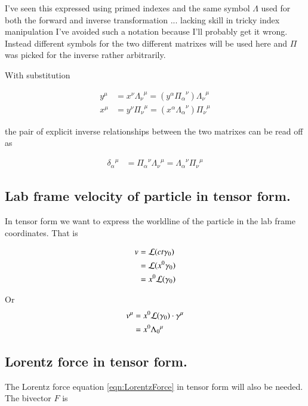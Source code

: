 \documentclass{article}
\newcommand{\ILambda}[0]{\Pi}
\begin{document}
I've seen this expressed using primed indexes and the same symbol $\Lambda$ used for both the forward and inverse
transformation ... lacking skill in tricky index manipulation I've avoided such a notation because I'll probably get it
wrong.  Instead different symbols for the two different matrixes will be used here and $\Pi$ was picked for the inverse
rather arbitrarily.

With substitution

\begin{align*}
y^\mu &= x^\nu {\Lambda_\nu}^\mu = (y^\alpha {\ILambda_\alpha}^\nu) {\Lambda_\nu}^\mu  \\
x^\mu &= y^\nu {\ILambda_\nu}^\mu = (x^\alpha {\Lambda_\alpha}^\nu) {\ILambda_\nu}^\mu 
\end{align*}

the pair of explicit inverse relationships between the two matrixes can be read off as

\begin{align}
{\delta_\alpha}^\mu &= {\ILambda_\alpha}^\nu {\Lambda_\nu}^\mu = {\Lambda_\alpha}^\nu {\ILambda_\nu}^\mu 
\end{align}

\subsection{ Lab frame velocity of particle in tensor form. }

In tensor form we want to express the worldline of the particle in the lab frame coordinates.  That is

\begin{align*}
v 
&= \mathcal{L}(c t \gamma_0) \\
&= \mathcal{L}(x^0 \gamma_0) \\
&= x^0 \mathcal{L}(\gamma_0) \\
\end{align*}

Or
\begin{align*}
v^\mu 
&= x^0 \mathcal{L}(\gamma_0) \cdot \gamma^\mu \\
&= x^0 {\Lambda_0}^\mu
\end{align*}

\subsection{ Lorentz force in tensor form. }

The Lorentz force equation \ref{eqn:LorentzForce} in tensor form will also be needed.  The bivector $F$ is
\end{document}
